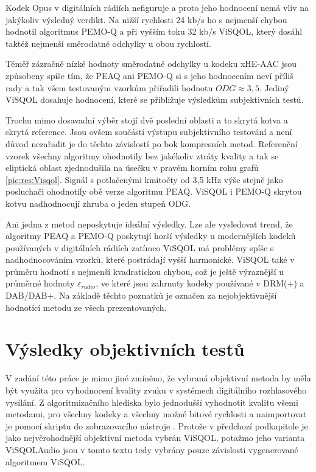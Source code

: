 Kodek Opus v digitálních rádiích nefiguruje a proto jeho hodnocení nemá vliv na jakýkoliv výsledný verdikt. Na nižší rychlosti 24 kb/s ho s nejmenší chybou hodnotil algoritmus PEMO-Q a při vyšším toku 32 kb/s ViSQOL, který dosáhl taktéž nejmenší směrodatné odchylky u obou rychlostí.

Téměř zázračně nízké hodnoty směrodatné odchylky u kodeku xHE-AAC jsou způsobeny spíše tím, že PEAQ ani PEMO-Q si s jeho hodnocením neví příliš rady a tak všem testovaným vzorkům přiřadili hodnotu $ODG \approx 3,5$. Jediný ViSQOL dosahuje hodnocení, které se přibližuje výsledkům subjektivních testů.

Trochu mimo dosavadní výběr stojí dvě poslední oblasti a to skrytá kotva a skrytá reference. Jsou ovšem součástí výstupu subjektivního testování a není důvod nezařadit je do těchto závislostí po bok kompresních metod. Referenční vzorek všechny algoritmy ohodnotily bez jakékoliv ztráty kvality a tak se eliptická oblast zjednodušila na úsečku v pravém horním rohu grafů \ref{pic:res:Visqol}. Signál s potlačenými kmitočty od 3,5 kHz výše stejně jako posluchači ohodnotily obě verze algoritmu PEAQ. ViSQOL i PEMO-Q skrytou kotvu nadhodnocují zhruba o jeden stupeň ODG.

Ani jedna z metod neposkytuje ideální výsledky. Lze ale vysledovat trend, že algoritmy PEAQ a PEMO-Q poskytují horší výsledky u modernějších kodeků používaných v digitálních rádiích zatímco ViSQOL má problémy spíše s nadhodnocováním vzorků, které postrádají vyšší harmonické. ViSQOL také v průměru hodnotí s nejmenší kvadratickou chybou, což je ještě výraznější u průměrné hodnoty $\varepsilon_{radio}$, ve které jsou zahrnuty kodeky používané v DRM(+) a DAB/DAB+. Na základě těchto poznatků je označen za nejobjektivnější hodnotící metodu ze všech prezentovaných.

\section{Výsledky objektivních testů}

V zadání této práce je mimo jiné zmíněno, že vybraná objektivní metoda by měla být využita pro vyhodnocení kvality zvuku v systémech digitálního rozhlasového vysílání. Z algoritmizačního hlediska bylo jednodušší vyhodnotit kvalitu všemi metodami, pro všechny kodeky a všechny možné bitové rychlosti a naimportovat je pomocí skriptu  do zobrazovacího nástroje . Protože v předchozí podkapitole je jako nejvěrohodnější objektivní metoda vybrán ViSQOL, potažmo jeho varianta ViSQOLAudio jsou v tomto textu tedy vybrány pouze závislosti vygenerované algoritmem ViSQOL. 

